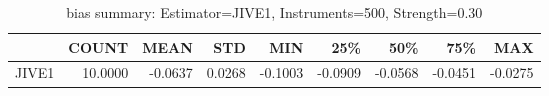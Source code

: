 \begin{table}[ht]
\centering
\caption{bias summary: Estimator=JIVE1, Instruments=500, Strength=0.30}
\begin{tabular}{lrrrrrrrr}
\toprule
 & COUNT & MEAN & STD & MIN & 25\% & 50\% & 75\% & MAX \\
\midrule
JIVE1 & 10.0000 & -0.0637 & 0.0268 & -0.1003 & -0.0909 & -0.0568 & -0.0451 & -0.0275 \\
\bottomrule
\end{tabular}
\end{table}
